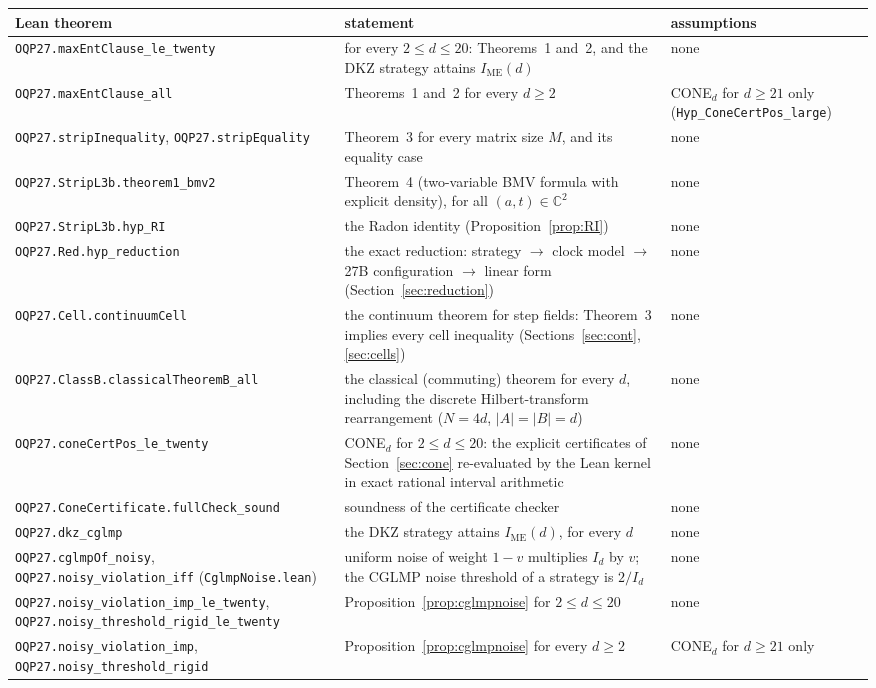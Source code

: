 \documentclass[11pt]{amsart}
\theoremstyle{definition}
\theoremstyle{remark}
\numberwithin{equation}{section}
\newcommand{\C}{\mathbb{C}}
\newcommand{\IME}{I_{\mathrm{ME}}}
\begin{document}
\begin{center}
\small
\begin{tabular}{>{\raggedright\arraybackslash}p{5.0cm}>{\raggedright\arraybackslash}p{6.9cm}>{\raggedright\arraybackslash}p{2.6cm}}
\toprule
Lean theorem & statement & assumptions\\
\midrule
\nolinkurl{OQP27.maxEntClause_le_twenty} & for every $2\le d\le20$: Theorems~1 and~2, and the DKZ strategy attains
$\IME(d)$ & none\\
\nolinkurl{OQP27.maxEntClause_all} & Theorems~1 and~2 for every $d\ge2$ & CONE$_d$ for $d\ge21$ only
(\nolinkurl{Hyp_ConeCertPos_large})\\
\nolinkurl{OQP27.stripInequality}, \nolinkurl{OQP27.stripEquality} & Theorem~3 for every matrix size $M$, and its
equality case & none\\
\nolinkurl{OQP27.StripL3b.theorem1_bmv2} & Theorem~4 (two-variable BMV formula with explicit density), for all
$(a,t)\in\C^2$ & none\\
\nolinkurl{OQP27.StripL3b.hyp_RI} & the Radon identity (Proposition~\ref{prop:RI}) & none\\
\nolinkurl{OQP27.Red.hyp_reduction} & the exact reduction: strategy $\to$ clock model $\to$ 27B configuration $\to$
linear form (Section~\ref{sec:reduction}) & none\\
\nolinkurl{OQP27.Cell.continuumCell} & the continuum theorem for step fields: Theorem~3 implies every cell inequality
(Sections~\ref{sec:cont}, \ref{sec:cells}) & none\\
\nolinkurl{OQP27.ClassB.classicalTheoremB_all} & the classical (commuting) theorem for every $d$, including the discrete
Hilbert-transform rearrangement ($N=4d$, $|A|=|B|=d$) & none\\
\nolinkurl{OQP27.coneCertPos_le_twenty} & CONE$_d$ for $2\le d\le20$: the explicit certificates of
Section~\ref{sec:cone} re-evaluated by the Lean kernel in exact rational interval arithmetic & none\\
\nolinkurl{OQP27.ConeCertificate.fullCheck_sound} & soundness of the certificate checker & none\\
\nolinkurl{OQP27.dkz_cglmp} & the DKZ strategy attains $\IME(d)$, for every $d$ & none\\
\nolinkurl{OQP27.cglmpOf_noisy}, \nolinkurl{OQP27.noisy_violation_iff} (\texttt{CglmpNoise.lean}) & uniform noise of
weight $1-v$ multiplies $I_d$ by $v$; the CGLMP noise threshold of a strategy is $2/I_d$ & none\\
\nolinkurl{OQP27.noisy_violation_imp_le_twenty}, \nolinkurl{OQP27.noisy_threshold_rigid_le_twenty} &
Proposition~\ref{prop:cglmpnoise} for $2\le d\le20$ & none\\
\nolinkurl{OQP27.noisy_violation_imp}, \nolinkurl{OQP27.noisy_threshold_rigid} & Proposition~\ref{prop:cglmpnoise} for
every $d\ge2$ & CONE$_d$ for $d\ge21$ only\\
\bottomrule
\end{tabular}
\end{center}
\end{document}

